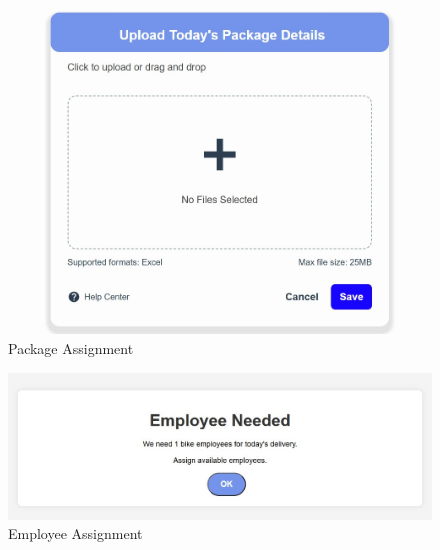\begin{figure}[H]  %
\centering
    \includegraphics[scale=0.3]{4/Package_Upload.jpg}
    \caption{Package Assignment}
    \label{fig:package_upload}
\end{figure}
\begin{figure}[H]  %
\centering
    \includegraphics[scale=0.5]{4/Employee1.jpg}
    \caption{Employee Assignment}
    \label{fig:employye_assignment}
\end{figure}
